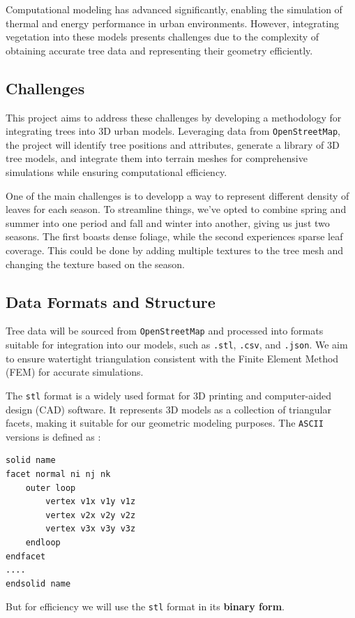 \documentclass[12pt]{article}
\begin{document}
Computational modeling has advanced significantly, enabling the simulation of thermal
and energy performance in urban environments. However, integrating vegetation into
these models presents challenges due to the complexity of obtaining accurate tree data
and representing their geometry efficiently\cite{AdTree}.

\newpage

\subsection{Challenges}
This project aims to address these challenges by developing a methodology for
integrating trees into 3D urban models. Leveraging data from \texttt{OpenStreetMap},
the  project will identify tree positions and attributes, generate a library of 3D tree
models, and integrate them into terrain meshes for comprehensive simulations while
ensuring computational efficiency.

One of the main challenges is to developp a way to represent different density
of leaves for each season. To streamline things, we've opted to combine spring
and summer into one period and fall and winter into another, giving us just two
seasons. The first boasts dense foliage, while the second experiences sparse leaf coverage.
This could be done by adding multiple textures to the tree mesh and changing
the texture based on the season.

\subsection{Data Formats and Structure}
Tree data will be sourced from \texttt{OpenStreetMap} and processed into formats suitable for
integration into our models, such as \texttt{.stl}, \texttt{.csv}, and \texttt{.json}.
We aim to ensure watertight triangulation consistent with the Finite Element Method
(FEM) for accurate simulations.

The \texttt{stl} format\cite{stl_format} is a widely used format for 3D printing and computer-aided design (CAD)
software. It represents 3D models as a collection of triangular facets, making it
suitable for our geometric modeling purposes.
The \texttt{ASCII} versions is defined as :
\begin{lstlisting}
solid name
facet normal ni nj nk
    outer loop
        vertex v1x v1y v1z
        vertex v2x v2y v2z
        vertex v3x v3y v3z
    endloop
endfacet
....
endsolid name
\end{lstlisting}
But for efficiency we will use the \texttt{stl} format in its \textbf{binary form}.
\end{document}
